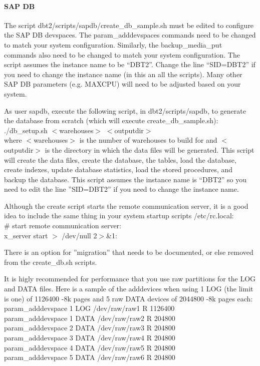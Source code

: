 \documentclass{article}
\begin{document}
\paragraph{SAP DB}

The script dbt2/scripts/sapdb/create\_db\_sample.sh must be edited to
configure the SAP DB devspaces.  The param\_adddevspaces commands need to be
changed to match your system configuration.  Similarly, the backup\_media\_put
commands also need to be changed to match your system configuration.  The
script assumes the instance name to be ``DBT2''.  Change the line ``SID=DBT2''
if you need to change the instance name (in this an all the scripts).  Many
other SAP DB parameters (e.g. MAXCPU) will need to be adjusted based on your
system.

\noindent
As user sapdb, execute the following script, in dbt2/scripts/sapdb, to
generate the database from scratch (which will execute
create\_db\_sample.sh): \\
\indent ./db\_setup.sh $<$warehouses$>$ $<$outputdir$>$ \\
where $<$warehouses$>$ is the number of warehouses to build for and
$<$outputdir$>$ is the directory in which the data files will be generated.
This script will create the data files, create the database, the tables, load
the database, create indexes, update database statistics, load the stored
procedures, and backup the database.  This script assumes the instance name is
``DBT2'' so you need to edit the line ''SID=DBT2'' if you need to change the
instance name.

\noindent
Although the create script starts the remote communication server, it is a
good idea to include the same thing in your system startup scripts
/etc/rc.local: \\
\indent \# start remote communication server: \\
\indent x\_server start $>$ /dev/null 2$>$\&1:

\noindent
There is an option for ''migration'' that needs to be documented, or else
removed from the create\_db.sh scripts.

\noindent
It is higly recommended for performance that you use raw partitions for the
LOG and DATA files.  Here is a sample of the adddevices when using 1 LOG (the
limit is one)  of 1126400 -8k pages and 5 raw DATA devices of 2044800 -8k
pages each: \\
\indent param\_adddevspace 1 LOG  /dev/raw/raw1 R 1126400 \\
\indent param\_adddevspace 1 DATA /dev/raw/raw2 R 204800 \\
\indent param\_adddevspace 2 DATA /dev/raw/raw3 R 204800 \\
\indent param\_adddevspace 3 DATA /dev/raw/raw4 R 204800 \\
\indent param\_adddevspace 4 DATA /dev/raw/raw5 R 204800 \\
\indent param\_adddevspace 5 DATA /dev/raw/raw6 R 204800
\end{document}
